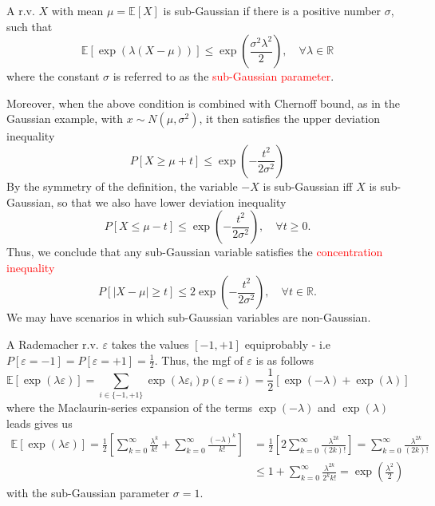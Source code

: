 \documentclass[10pt,handout,english]{beamer}
\newcommand{\E}{\mathbb{E}}
\newcommand{\R}{\mathbb{R}}
\newcommand{\1}{\mathbbm{1}}
\begin{document}
\begin{frame}[allowframebreaks]
\begin{definition}
A r.v. $X$ with mean $\mu=\E[X]$ is sub-Gaussian if there is a positive number $\sigma$, such that
\[
\E[\exp(\lambda(X-\mu))]\leq\exp\left(\frac{\sigma^2\lambda^2}{2}\right),\quad\forall\lambda\in\R
\]
where the constant $\sigma$ is referred to as the \textcolor{red}{sub-Gaussian parameter}. 
\end{definition}
Moreover, when the above condition is combined with Chernoff bound, as in the Gaussian example, with $x\sim N(\mu,\sigma^2)$, it then satisfies the upper deviation inequality
\[
P[X\geq\mu+t]\leq\exp\left(-\frac{t^2}{2\sigma^2}\right)
\]
 By the symmetry of the definition, the variable $-X$ is sub-Gaussian iff $X$ is sub-Gaussian, so that we also have lower deviation inequality 
\[
P[X\leq\mu-t ]\leq\exp\left(-\frac{t^2}{2\sigma^2}\right), \quad\forall t\geq 0.
\]
Thus, we conclude that any sub-Gaussian variable satisfies the \textcolor{red}{concentration inequality}
\[
P[\lvert X-\mu\rvert\geq t]\leq2\exp\left(-\frac{t^2}{2\sigma^2}\right),\quad\forall t\in\R.
\]
We may have scenarios in which sub-Gaussian variables are non-Gaussian.
\end{frame}
\begin{frame}
\begin{example}
A Rademacher r.v. $\varepsilon$ takes the values $[-1,+1]$ equiprobably - i.e $P[\varepsilon=-1]=P[\varepsilon=+1]=\frac{1}{2}$. Thus, the mgf of $\varepsilon$ is as follows
\[
\E[\exp(\lambda \varepsilon)]=\sum_{i\in\{-1,+1\}} \exp(\lambda\varepsilon_i)p(\varepsilon=i)=\frac{1}{2}[\exp(-\lambda)+\exp(\lambda)]
\]
where the Maclaurin-series expansion of the terms $\exp(-\lambda)$ and $\exp(\lambda)$ leads gives us
\begin{align*}
\E[\exp(\lambda \varepsilon)]=\frac{1}{2}\left[\sum\limits_{k=0}^{\infty}\frac{\lambda^k}{k!}+\sum\limits_{k=0}^{\infty}\frac{(-\lambda)^k}{k!}\right]&=\frac{1}{2}\left[2\sum\limits_{k=0}^{\infty}\frac{\lambda^{2k}}{(2k)!}\right]=\sum\limits_{k=0}^{\infty}\frac{\lambda^{2k}}{(2k)!}\\
&\leq 1+\sum\limits_{k=0}^{\infty}\frac{\lambda^{2k}}{2^kk!}=\exp\left(\frac{\lambda^2}{2}\right)
\end{align*}
with the sub-Gaussian parameter $\sigma=1$.
\end{example}
\end{frame}
\end{document}

